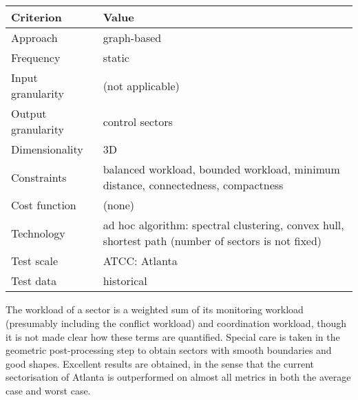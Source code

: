 \documentclass[a4paper,12pt]{article}
\begin{document}
\subsection{\cite{Li:ATIO09}}

\begin{center}
\begin{tabular}{|l|l|}
  \hline
  Criterion & Value \\
  \hline\hline
  Approach & graph-based \\ \hline
  Frequency & static \\ \hline
  Input granularity & (not applicable) \\ \hline
  Output granularity & control sectors \\ \hline
  Dimensionality & 3D \\ \hline
  Constraints & \parbox{11.5cm}{balanced workload, bounded
    workload, minimum distance, connectedness, compactness} \\ \hline
  Cost function & (none) \\ \hline
  Technology & \parbox{11.5cm}{ad hoc algorithm: spectral clustering,
    convex hull, shortest path (number of sectors is not fixed)} \\ \hline
  Test scale & ATCC: Atlanta \\ \hline
  Test data & historical \\ \hline
\end{tabular}
\end{center}
The workload of a sector is a weighted sum of its monitoring workload
(presumably including the conflict workload) and coordination
workload, though it is not made clear how these terms are quantified.
Special care is taken in the geometric post-processing step to obtain
sectors with smooth boundaries and good shapes.  Excellent results are
obtained, in the sense that the current sectorisation of Atlanta is
outperformed on almost all metrics in both the average case and worst
case.

\subsection{\cite{Bloem:ICAS10}}
\end{document}
